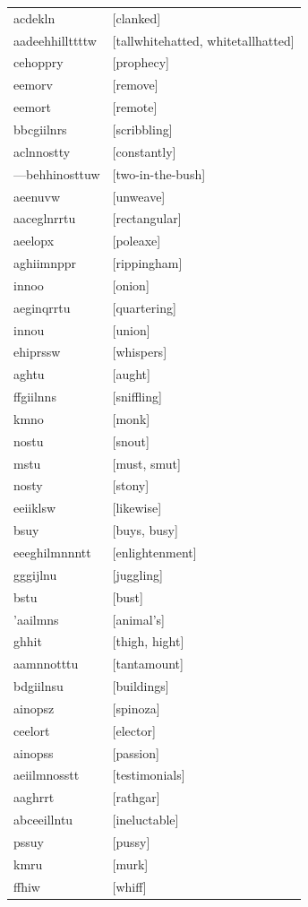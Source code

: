 \documentclass{article}
\begin{document}
\begin{tabular}{ll}
acdekln & [clanked] \\
aadeehhillttttw & [tallwhitehatted, whitetallhatted] \\
cehoppry & [prophecy] \\
eemorv & [remove] \\
eemort & [remote] \\
bbcgiilnrs & [scribbling] \\
aclnnostty & [constantly] \\
---behhinosttuw & [two-in-the-bush] \\
aeenuvw & [unweave] \\
aaceglnrrtu & [rectangular] \\
aeelopx & [poleaxe] \\
aghiimnppr & [rippingham] \\
innoo & [onion] \\
aeginqrrtu & [quartering] \\
innou & [union] \\
ehiprssw & [whispers] \\
aghtu & [aught] \\
ffgiilnns & [sniffling] \\
kmno & [monk] \\
nostu & [snout] \\
mstu & [must, smut] \\
nosty & [stony] \\
eeiiklsw & [likewise] \\
bsuy & [buys, busy] \\
eeeghilmnnntt & [enlightenment] \\
gggijlnu & [juggling] \\
bstu & [bust] \\
'aailmns & [animal's] \\
ghhit & [thigh, hight] \\
aamnnotttu & [tantamount] \\
bdgiilnsu & [buildings] \\
ainopsz & [spinoza] \\
ceelort & [elector] \\
ainopss & [passion] \\
aeiilmnosstt & [testimonials] \\
aaghrrt & [rathgar] \\
abceeillntu & [ineluctable] \\
pssuy & [pussy] \\
kmru & [murk] \\
ffhiw & [whiff] \\

\end{tabular}
\end{document}
